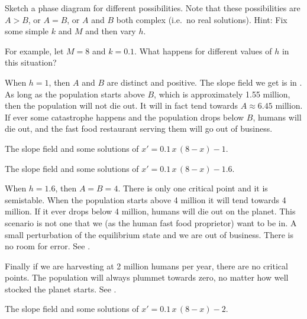 \begin{exercise}
Sketch a phase diagram for different possibilities.  Note
that these possibilities are $A > B$, or $A=B$, or $A$ and $B$ both complex
(i.e.\ no real solutions).  Hint: Fix some simple $k$ and $M$ and then vary
$h$.
\end{exercise}

\begin{example} 
For example, let $M=8$ and $k=0.1$. What happens for different values of $h$ in this situation?
\end{example}

\begin{exampleSol}
When $h=1$, then $A$ and $B$ are distinct and positive.
The slope field we get is in .  As long as 
the population starts above $B$, which is approximately 1.55 million, then
the population will not die out.  It will in fact tend towards $A \approx
6.45$ million.  If ever some catastrophe happens and
the population drops below $B$,
humans will die out, and the fast food restaurant serving them will go out
of business.

\begin{myfig}
\parbox[t]{3.0in}{
 \capstart
 \caption{The slope field and some solutions of
 $x' = 0.1\,x\,(8-x)-1$.\label{2.2:harv1}}
}
\quad
\parbox[t]{3.0in}{
 \capstart
 \caption{The slope field and some solutions of
 $x' = 0.1\,x\,(8-x)-1.6$.\label{2.2:harvc}}
}
\end{myfig}

When $h = 1.6$, then $A=B=4$.  There is only one critical point and it is
semistable.  When the population starts above 4 million it will tend towards
4 million.  If it ever drops below 4 million, humans will die out on the
planet.  This scenario is not one that we (as the human fast food proprietor) 
want to be in.  A small perturbation of the equilibrium state and we are out
of business.  There is no room for error.  See .

Finally if we are harvesting at 2 million humans per year, there are no
critical points.
The population
will always plummet towards zero, no matter how well stocked the planet
starts.  See .

\begin{myfig}
\capstart
{}
\caption{The slope field and some solutions of
$x' = 0.1\,x\,(8-x)-2$.\label{2.2:harv2}}
\end{myfig}


\end{exampleSol}
